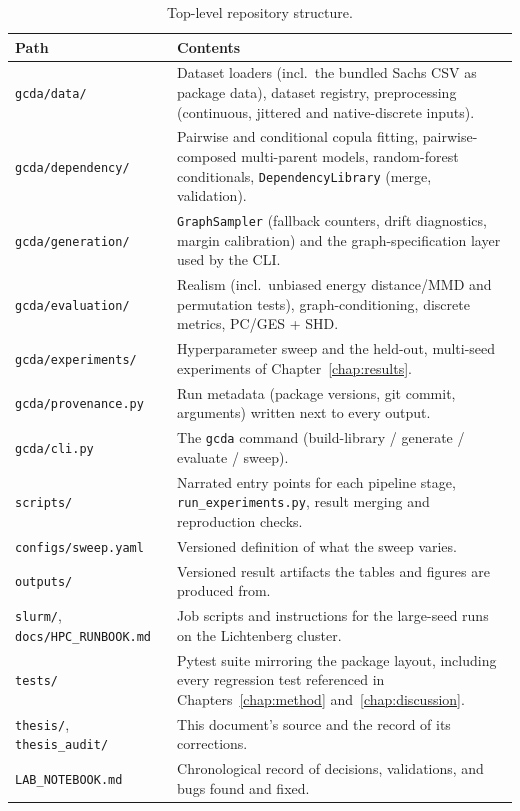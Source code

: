 \documentclass[
  english,
  class=report,
  accentcolor=2c,
  marginpar=false,
  parskip=half-,
  fontsize=11pt,
  ruledheaders=false,
  pdfa=false,
  IMRAD=false,
  thesis={type=master}
]{tudapub}
\begin{document}
\begin{table}[ht]
\caption{Top-level repository structure.}
\label{tab:repo-layout}
\centering
\small
\begin{tabular}{lp{9.5cm}}
\toprule
\textbf{Path} & \textbf{Contents} \\
\midrule
\texttt{gcda/data/} & Dataset loaders (incl.\ the bundled Sachs CSV as package data), dataset registry, preprocessing (continuous, jittered and native-discrete inputs). \\
\texttt{gcda/dependency/} & Pairwise and conditional copula fitting, pairwise-composed multi-parent models, random-forest conditionals, \texttt{DependencyLibrary} (merge, validation). \\
\texttt{gcda/generation/} & \texttt{GraphSampler} (fallback counters, drift diagnostics, margin calibration) and the graph-specification layer used by the CLI. \\
\texttt{gcda/evaluation/} & Realism (incl.\ unbiased energy distance/MMD and permutation tests), graph-conditioning, discrete metrics, PC/GES + SHD. \\
\texttt{gcda/experiments/} & Hyperparameter sweep and the held-out, multi-seed experiments of Chapter~\ref{chap:results}. \\
\texttt{gcda/provenance.py} & Run metadata (package versions, git commit, arguments) written next to every output. \\
\texttt{gcda/cli.py} & The \texttt{gcda} command (build-library / generate / evaluate / sweep). \\
\texttt{scripts/} & Narrated entry points for each pipeline stage, \texttt{run\_experiments.py}, result merging and reproduction checks. \\
\texttt{configs/sweep.yaml} & Versioned definition of what the sweep varies. \\
\texttt{outputs/} & Versioned result artifacts the tables and figures are produced from. \\
\texttt{slurm/}, \texttt{docs/HPC\_RUNBOOK.md} & Job scripts and instructions for the large-seed runs on the Lichtenberg cluster. \\
\texttt{tests/} & Pytest suite mirroring the package layout, including every regression test referenced in Chapters~\ref{chap:method} and~\ref{chap:discussion}. \\
\texttt{thesis/}, \texttt{thesis\_audit/} & This document's source and the record of its corrections. \\
\texttt{LAB\_NOTEBOOK.md} & Chronological record of decisions, validations, and bugs found and fixed. \\
\bottomrule
\end{tabular}
\end{table}
\end{document}
